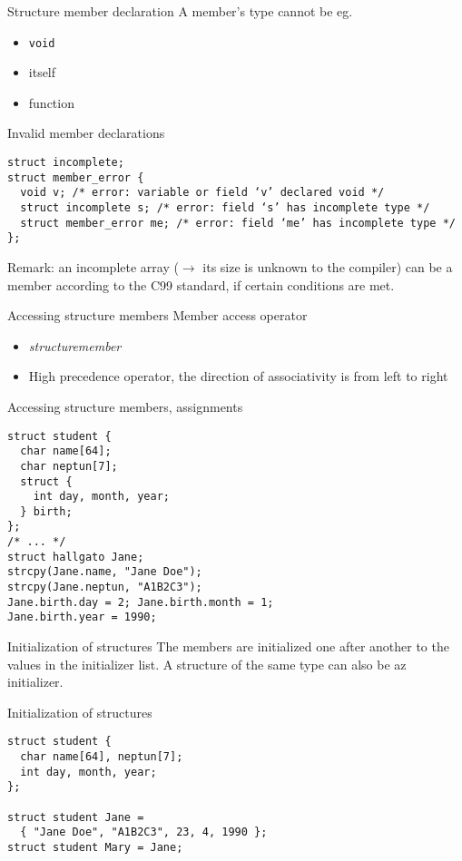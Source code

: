 \documentclass[usenames,dvipsnames,aspectratio=169]{beamer}
\begin{document}
\begin{frame}[fragile]{Structure member declaration}
  A member's type cannot be eg.
  \begin{itemize}
    \item \texttt{void}
    \item itself
    \item function
  \end{itemize}
  \scriptsize
  \begin{alertblock}{Invalid member declarations}
    \begin{verbatim}
struct incomplete;
struct member_error {
  void v; /* error: variable or field ‘v’ declared void */
  struct incomplete s; /* error: field ‘s’ has incomplete type */
  struct member_error me; /* error: field ‘me’ has incomplete type */
};
\end{verbatim}
  \end{alertblock}
  \tiny
  Remark: an incomplete array ($\to$ its size is unknown to the compiler) can be a member according to the C99 standard, if certain conditions are met.
\end{frame}

\begin{frame}[fragile]{Accessing structure members}
  Member access operator
  \begin{itemize}
    \item \emph{structuremember}
    \item High precedence operator, the direction of associativity is from left to right
  \end{itemize}
  \footnotesize
  \begin{exampleblock}{Accessing structure members, assignments}
    \begin{verbatim}
struct student {
  char name[64];
  char neptun[7];
  struct {
    int day, month, year;
  } birth;
};
/* ... */
struct hallgato Jane;
strcpy(Jane.name, "Jane Doe");
strcpy(Jane.neptun, "A1B2C3");
Jane.birth.day = 2; Jane.birth.month = 1; 
Jane.birth.year = 1990;
\end{verbatim}
  \end{exampleblock}
\end{frame}

\begin{frame}[fragile]{Initialization of structures}
  The members are initialized one after another to the values in the initializer list.
  A structure of the same type can also be az initializer.
  \begin{exampleblock}{Initialization of structures}
    \begin{verbatim}
struct student {
  char name[64], neptun[7];
  int day, month, year;
};

struct student Jane = 
  { "Jane Doe", "A1B2C3", 23, 4, 1990 };
struct student Mary = Jane;
\end{verbatim}
  \end{exampleblock}
\end{frame}
\end{document}
